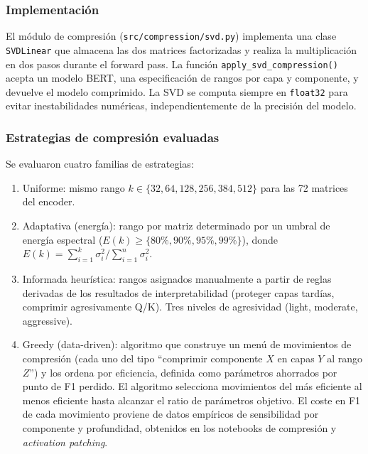 \subsubsection{Implementación}

El módulo de compresión (\texttt{src/compression/svd.py}) implementa una clase
\texttt{SVDLinear} que almacena las dos matrices factorizadas y realiza la
multiplicación en dos pasos durante el forward pass. La función
\texttt{apply\_svd\_compression()} acepta un modelo BERT, una especificación de
rangos por capa y componente, y devuelve el modelo comprimido. La SVD se computa
siempre en \texttt{float32} para evitar inestabilidades numéricas, independientemente
de la precisión del modelo.

\subsubsection{Estrategias de compresión evaluadas}

Se evaluaron cuatro familias de estrategias:

\begin{enumerate}[nosep]
    \item Uniforme: mismo rango $k \in \{32, 64, 128, 256, 384, 512\}$ para
    las 72 matrices del encoder.
    \item Adaptativa (energía): rango por matriz determinado por un umbral
    de energía espectral ($E(k) \geq \{80\%, 90\%, 95\%, 99\%\}$), donde
    $E(k) = \sum_{i=1}^k \sigma_i^2 / \sum_{i=1}^n \sigma_i^2$.
    \item Informada heurística: rangos asignados manualmente a partir de
    reglas derivadas de los resultados de interpretabilidad (proteger capas tardías,
    comprimir agresivamente Q/K). Tres niveles de agresividad (light, moderate,
    aggressive).
    \item Greedy (data-driven): algoritmo que construye un menú de movimientos
    de compresión (cada uno del tipo ``comprimir componente $X$ en capas $Y$ al
    rango $Z$'') y los ordena por eficiencia, definida como parámetros ahorrados
    por punto de F1 perdido. El algoritmo selecciona movimientos del más eficiente
    al menos eficiente hasta alcanzar el ratio de parámetros objetivo. El coste
    en F1 de cada movimiento proviene de datos empíricos de sensibilidad por
    componente y profundidad, obtenidos en los notebooks de compresión y
    \emph{activation patching}.
\end{enumerate}

